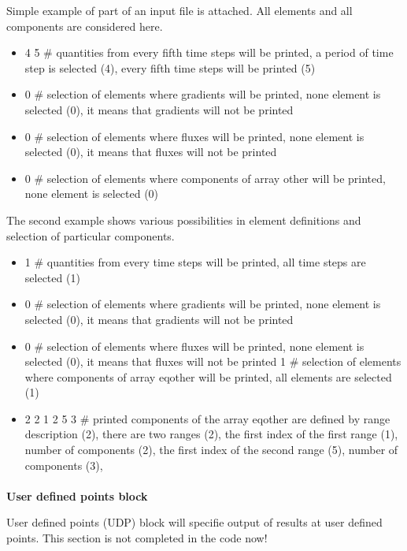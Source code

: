 Simple example of part of an input file is attached. All elements and all components
are considered here. 

\begin{itemize}
\item[]
4 5 \# quantities from every fifth time steps will be printed, a period of time step is selected (4), 
every fifth time steps will be printed (5)
\item[]
0 \# selection of elements where gradients will be printed, none element is selected (0), it means that gradients
will not be printed
\item[]
0 \# selection of elements where fluxes will be printed, none element is selected (0), it means that fluxes
will not be printed
\item[]
0 \# selection of elements where components of array other will be printed, none element is selected (0)
\end{itemize}


The second example shows various possibilities in element definitions and selection of particular components.

\begin{itemize}
\item[]
1 \# quantities from every time steps will be printed, all time steps are selected (1)
\item[]
0 \# selection of elements where gradients will be printed, none element is selected (0), it means that gradients
will not be printed
\item[]
0 \# selection of elements where fluxes will be printed, none element is selected (0), it means that fluxes
will not be printed
1 \# selection of elements where components of array eqother will be printed, all elements are selected (1)
\item[]
2 2 1 2 5 3 \# printed components of the array eqother are defined by range description (2), there are two
ranges (2), the first index of the first range (1), number of components (2),
the first index of the second range (5), number of components (3),
\end{itemize}


\paragraph{}{\bf User defined points block}

User defined points (UDP) block will specifie output of results at user defined points.
This section is not completed in the code now!



